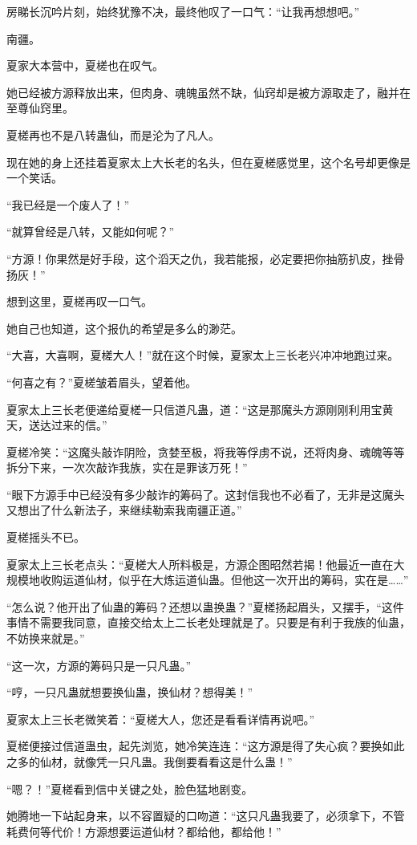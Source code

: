 \begin{this_body}
房睇长沉吟片刻，始终犹豫不决，最终他叹了一口气：“让我再想想吧。”

南疆。

夏家大本营中，夏槎也在叹气。

她已经被方源释放出来，但肉身、魂魄虽然不缺，仙窍却是被方源取走了，融并在至尊仙窍里。

夏槎再也不是八转蛊仙，而是沦为了凡人。

现在她的身上还挂着夏家太上大长老的名头，但在夏槎感觉里，这个名号却更像是一个笑话。

“我已经是一个废人了！”

“就算曾经是八转，又能如何呢？”

“方源！你果然是好手段，这个滔天之仇，我若能报，必定要把你抽筋扒皮，挫骨扬灰！”

想到这里，夏槎再叹一口气。

她自己也知道，这个报仇的希望是多么的渺茫。

“大喜，大喜啊，夏槎大人！”就在这个时候，夏家太上三长老兴冲冲地跑过来。

“何喜之有？”夏槎皱着眉头，望着他。

夏家太上三长老便递给夏槎一只信道凡蛊，道：“这是那魔头方源刚刚利用宝黄天，送达过来的信。”

夏槎冷笑：“这魔头敲诈阴险，贪婪至极，将我等俘虏不说，还将肉身、魂魄等等拆分下来，一次次敲诈我族，实在是罪该万死！”

“眼下方源手中已经没有多少敲诈的筹码了。这封信我也不必看了，无非是这魔头又想出了什么新法子，来继续勒索我南疆正道。”

夏槎摇头不已。

夏家太上三长老点头：“夏槎大人所料极是，方源企图昭然若揭！他最近一直在大规模地收购运道仙材，似乎在大炼运道仙蛊。但他这一次开出的筹码，实在是……”

“怎么说？他开出了仙蛊的筹码？还想以蛊换蛊？”夏槎扬起眉头，又摆手，“这件事情不需要我同意，直接交给太上二长老处理就是了。只要是有利于我族的仙蛊，不妨换来就是。”

“这一次，方源的筹码只是一只凡蛊。”

“哼，一只凡蛊就想要换仙蛊，换仙材？想得美！”

夏家太上三长老微笑着：“夏槎大人，您还是看看详情再说吧。”

夏槎便接过信道蛊虫，起先浏览，她冷笑连连：“这方源是得了失心疯？要换如此之多的仙材，就像凭一只凡蛊。我倒要看看这是什么蛊！”

“嗯？！”夏槎看到信中关键之处，脸色猛地剧变。

她腾地一下站起身来，以不容置疑的口吻道：“这只凡蛊我要了，必须拿下，不管耗费何等代价！方源想要运道仙材？都给他，都给他！”

\end{this_body}

